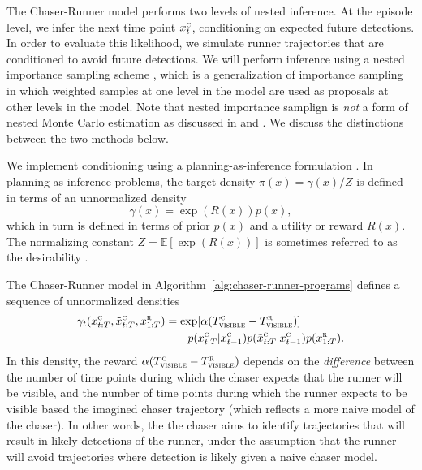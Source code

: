 \documentclass[twoside]{article}
\begin{document}
The Chaser-Runner model performs two levels of nested inference. At the episode level, we infer the next time point $x^\textsc{c}_t$, conditioning on expected future detections. In order to evaluate this likelihood, we simulate runner trajectories that are conditioned to avoid future detections. We will perform inference using a nested importance sampling scheme \cite{naesseth2015nested}, which is a generalization of importance sampling in which weighted samples at one level in the model are used as proposals at other levels in the model. Note that nested importance samplign is \emph{not} a form of nested Monte Carlo estimation as discussed in \textcite{rainforth2018nesting} and \textcite{rainforth2018nestingb}. We discuss the distinctions between the two methods below.


We implement conditioning using a planning-as-inference formulation \cite{toussaint06,vandemeent2016black-box}. 
In planning-as-inference problems, the target density $\pi(x) = \gamma(x) / Z$ is defined in terms of an unnormalized density
\begin{equation}
    \gamma(x) = \exp(R(x)) p(x),
\end{equation}
which in turn is defined in terms of prior $p(x)$ and a utility or reward $R(x)$. The normalizing constant $Z = \mathbb{E}[\exp(R(x))]$ is sometimes referred to as the desirability \cite{todorov2009efficient}. 

The Chaser-Runner model in Algorithm~\ref{alg:chaser-runner-programs} defines a sequence of unnormalized densities 
\begin{align*}
    \gamma_t(x^\textsc{c}_{t:T}, \tilde{x}^\textsc{c}_{t:T}, x^\textsc{r}_{1:T})
    &=
    \exp[\alpha (T^\textsc{c}_\textsc{visible} - T^\textsc{r}_\textsc{visible} )] 
    \\
    &~~~~~~
    p(x^\textsc{c}_{t:T} | x^\textsc{c}_{t-1})
    p(\tilde{x}^\textsc{c}_{t:T} | x^\textsc{c}_{t-1})
    p(x^\textsc{r}_{1:T}).
\end{align*}
In this density, the reward $\alpha (T^\textsc{c}_\textsc{visible} - T^\textsc{r}_\textsc{visible})$ depends on the \emph{difference} between the number of time points during which the chaser expects that the runner will be visible, and the number of time points during which the runner expects to be visible based the imagined chaser trajectory (which reflects a more naive model of the chaser). In other words, the the chaser aims to identify trajectories that will result in likely detections of the runner, under the assumption that the runner will avoid trajectories where detection is likely given a naive chaser model. 
\end{document}
